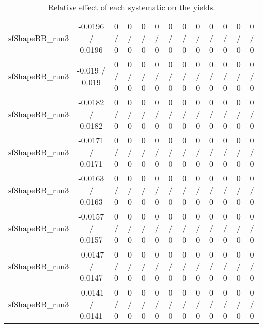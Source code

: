 \documentclass[10pt]{article}
\begin{document}
\begin{table}[htbp]
\begin{center}
\begin{tabular}{|c|c|c|c|c|c|c|c|c|c|c|c|c|}
  sfShapeBB_run3 & -0.0196 / 0.0196 & 0 / 0 & 0 / 0 & 0 / 0 & 0 / 0 & 0 / 0 & 0 / 0 & 0 / 0 & 0 / 0 & 0 / 0 & 0 / 0 & 0 / 0 \\ 
  sfShapeBB_run3 & -0.019 / 0.019 & 0 / 0 & 0 / 0 & 0 / 0 & 0 / 0 & 0 / 0 & 0 / 0 & 0 / 0 & 0 / 0 & 0 / 0 & 0 / 0 & 0 / 0 \\ 
  sfShapeBB_run3 & -0.0182 / 0.0182 & 0 / 0 & 0 / 0 & 0 / 0 & 0 / 0 & 0 / 0 & 0 / 0 & 0 / 0 & 0 / 0 & 0 / 0 & 0 / 0 & 0 / 0 \\ 
  sfShapeBB_run3 & -0.0171 / 0.0171 & 0 / 0 & 0 / 0 & 0 / 0 & 0 / 0 & 0 / 0 & 0 / 0 & 0 / 0 & 0 / 0 & 0 / 0 & 0 / 0 & 0 / 0 \\ 
  sfShapeBB_run3 & -0.0163 / 0.0163 & 0 / 0 & 0 / 0 & 0 / 0 & 0 / 0 & 0 / 0 & 0 / 0 & 0 / 0 & 0 / 0 & 0 / 0 & 0 / 0 & 0 / 0 \\ 
  sfShapeBB_run3 & -0.0157 / 0.0157 & 0 / 0 & 0 / 0 & 0 / 0 & 0 / 0 & 0 / 0 & 0 / 0 & 0 / 0 & 0 / 0 & 0 / 0 & 0 / 0 & 0 / 0 \\ 
  sfShapeBB_run3 & -0.0147 / 0.0147 & 0 / 0 & 0 / 0 & 0 / 0 & 0 / 0 & 0 / 0 & 0 / 0 & 0 / 0 & 0 / 0 & 0 / 0 & 0 / 0 & 0 / 0 \\ 
  sfShapeBB_run3 & -0.0141 / 0.0141 & 0 / 0 & 0 / 0 & 0 / 0 & 0 / 0 & 0 / 0 & 0 / 0 & 0 / 0 & 0 / 0 & 0 / 0 & 0 / 0 & 0 / 0 \\ 
\hline 
\end{tabular} 
\caption{Relative effect of each systematic on the yields.} 
\end{center} 
\end{table} 
\end{document}
